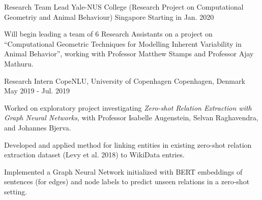 

\begin{cventries}

  \cventry
  {Research Team Lead} %
  {Yale-NUS College (Research Project on Computational Geometriy and Animal Behaviour)} %
  {Singapore} %
  {Starting in Jan. 2020} %
  {
    \begin{cvitems} %
    \item {Will begin leading a team of 6 Research Assistants on a project on
        ``Computational Geometric Techniques for Modelling Inherent Variability
        in Animal Behavior'', working with Professor Matthew Stamps and
        Professor Ajay Mathuru.}
    \end{cvitems}
  }
    
  \cventry
  {Research Intern} %
  {CopeNLU, University of Copenhagen} %
  {Copenhagen, Denmark} %
  {May 2019 - Jul. 2019} %
  {
    \begin{cvitems} %
    \item {Worked on exploratory project investigating \textit{Zero-shot
          Relation Extraction with Graph Neural Networks}, with Professor
        Isabelle Augenstein, Selvan Raghavendra, and Johannes Bjerva.}
    \item {Developed and applied method for linking entities in existing
        zero-shot relation extraction dataset (Levy et al. 2018) to WikiData
        entries.}
    \item {Implemented a Graph Neural Network initialized with BERT embeddings
        of sentences (for edges) and node labels to predict unseen relations in
        a zero-shot setting.}
    \end{cvitems}
  }

\end{cventries}
